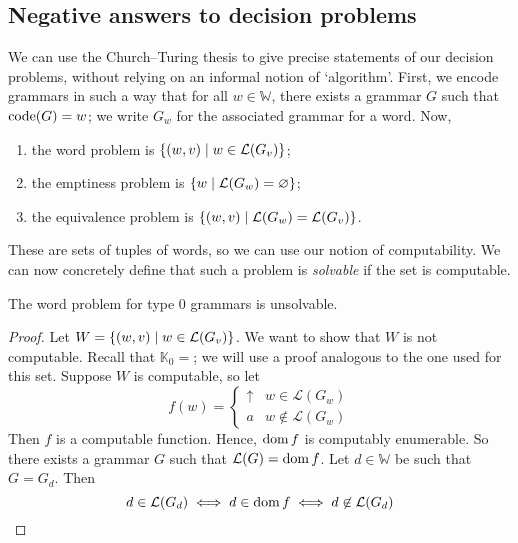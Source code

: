 \subsection{Negative answers to decision problems}
We can use the Church--Turing thesis to give precise statements of our decision problems, without relying on an informal notion of `algorithm'.
First, we encode grammars in such a way that for all \( w \in \mathbb W \), there exists a grammar \( G \) such that \( \operatorname{code}(G) = w \); we write \( G_w \) for the associated grammar for a word.
Now,
\begin{enumerate}
	\item the word problem is \( \qty{(w, v) \mid w \in \mathcal L(G_v)} \);
	\item the emptiness problem is \( \qty{w \mid \mathcal L(G_w) = \varnothing} \);
	\item the equivalence problem is \( \qty{(w, v) \mid \mathcal L(G_w) = \mathcal L(G_v)} \).
\end{enumerate}
These are sets of tuples of words, so we can use our notion of computability.
We can now concretely define that such a problem is \emph{solvable} if the set is computable.
\begin{theorem}
	The word problem for type 0 grammars is unsolvable.
\end{theorem}
\begin{proof}
	Let \( W = \qty{(w, v) \mid w \in \mathcal L(G_v)} \).
	We want to show that \( W \) is not computable.
	Recall that \( \mathbb K_0 = \); we will use a proof analogous to the one used for this set.
	Suppose \( W \) is computable, so let
	\[ f(w) = \begin{cases}
		\uparrow & w \in \mathcal L(G_w) \\
		a & w \not\in \mathcal L(G_w)
	\end{cases} \]
	Then \( f \) is a computable function.
	Hence, \( \operatorname{dom} f \) is computably enumerable.
	So there exists a grammar \( G \) such that \( \mathcal L(G) = \operatorname{dom} f \).
	Let \( d \in \mathbb W \) be such that \( G = G_d \).
	Then
	\[ d \in \mathcal L(G_d) \iff d \in \operatorname{dom} f \iff d \not\in \mathcal L(G_d) \]
\end{proof}
